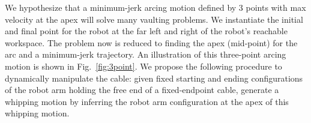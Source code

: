 We hypothesize that a minimum-jerk arcing motion defined by 3 points with max velocity at the apex will solve many vaulting problems. We instantiate the initial and final point for the robot at the far left and right of the robot's reachable workspace. The problem now is reduced to finding the apex (mid-point) for the arc and a minimum-jerk trajectory.
An illustration of this three-point arcing motion is shown in Fig.~\ref{fig:3point}. We propose the following procedure to dynamically manipulate the cable: given fixed starting and ending configurations of the robot arm holding the free end of a fixed-endpoint cable, generate a whipping motion by inferring the robot arm configuration at the apex of this whipping motion.



